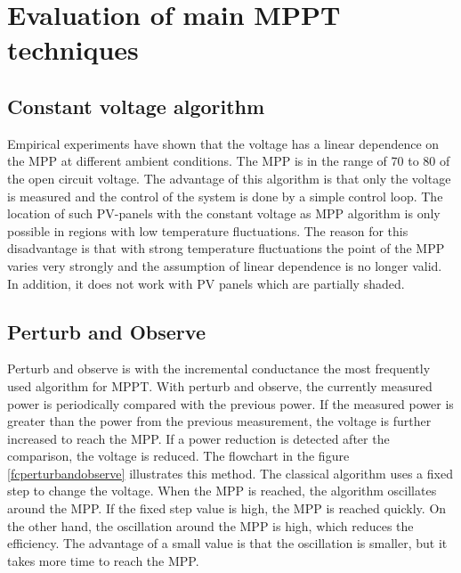 \section{Evaluation of main MPPT techniques\label{MPPTalgo}}

\subsection{Constant voltage algorithm}
Empirical experiments have shown that the voltage has a linear dependence on the MPP at different ambient conditions. The MPP is in the range of 70 to 80 of the open circuit voltage. The advantage of this algorithm is that only the voltage is measured and the control of the system is done by a simple control loop. The location of such PV-panels with the constant voltage as MPP algorithm is only possible in regions with low temperature fluctuations. The reason for this disadvantage is that with strong temperature fluctuations the point of the MPP varies very strongly and the assumption of linear dependence is no longer valid. In addition, it does not work with PV panels which are partially shaded.\cite{}

\subsection{Perturb and Observe}
Perturb and observe is with the incremental conductance the most frequently used algorithm for MPPT. With perturb and observe, the currently measured power is periodically compared with the previous power. If the measured power is greater than the power from the previous measurement, the voltage is further increased to reach the MPP. If a power reduction is detected after the comparison, the voltage is reduced. The flowchart in the figure \ref{fcperturbandobserve} illustrates this method. The classical algorithm uses a fixed step to change the voltage. When the MPP is reached, the algorithm oscillates around the MPP. If the fixed step value is high, the MPP is reached quickly. On the other hand, the oscillation around the MPP is high, which reduces the efficiency. The advantage of a small value is that the oscillation is smaller, but it takes more time to reach the MPP.

